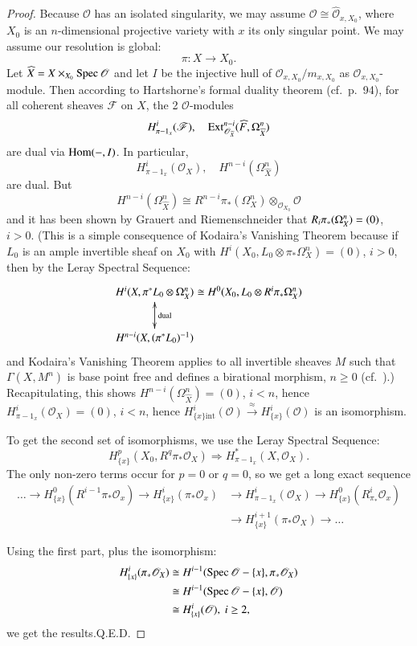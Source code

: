 \begin{proof}
Because $\mathscr{O}$ has an isolated singularity, we may assume
$\mathscr{O}\cong \widehat{\mathscr{O}}_{x,X_{0}}$, where $X_{0}$ is
an $n$-dimensional projective variety with $x$ its only singular
point. We may assume our resolution is global:
$$
\pi :X\to X_{0}.
$$
Let $\widehat{X}=X\times_{X_{0}}\operatorname{Spec} \mathscr{O}$ and let $I$ be the
injective hull of $\mathscr{O}_{x,X_{0}}/m_{x,X_{0}}$ as
$\mathscr{O}_{x,X_{0}}$-module. Then according to Hartshorne's formal
duality theorem (cf.~\cite{art01-key7}p.~94), for all coherent
sheaves $\mathscr{F}$ on $X$, the 2 $\mathscr{O}$-modules
$$
H^{i}_{\pi-1_x}(\mathscr{F}),\quad \operatorname{Ext}^{n-i}_{\mathscr{O}_{\widehat{X}}}(\widehat{F},\Omega^{n}_{\widehat{X}}) 
$$
are dual via $\operatorname{Hom}(-,I)$. In particular,
$$
H^{i}_{\pi-1_x}(\mathscr{O}_{X}),\quad
H^{n-i}(\Omega^{n}_{\widehat{X}})
$$
are dual. But 
$$
H^{n-i}(\Omega^{n}_{\widehat{X}})\cong R^{n-i}\pi_\ast
(\Omega^{n}_{X})\otimes_{\mathscr{O}_{X_{0}}}\mathscr{O} 
$$
and it has been shown by Grauert and Riemenschneider \cite{art01-key5}
that $R_{i}\pi_{\ast}\break (\Omega^{n}_{X})=(0)$, $i>0$. (This is a simple
consequence of Kodaira's Vanishing Theorem because if $L_{0}$ is an
ample invertible sheaf on $X_{0}$ with\pageoriginale
$H^{i}(X_{0},L_{0}\otimes \pi_{\ast}\Omega^{n}_{X})=(0)$, $i>0$, then
by the Leray Spectral Sequence:
\[
\xymatrix@C=-.1cm{
H^{i}(X,\pi^{*}L_{0}\otimes \Omega^{n}_{X})\ar@{<->}[d]^-{\text{dual}}
& \cong H^{0}(X_{0},L_{0}\otimes R^{i}\pi_{\ast}\Omega^{n}_{X})\\
H^{n-i}(X,(\pi^{*}L_{0})^{-1}) & 
}
\]
and Kodaira's Vanishing Theorem applies to all invertible sheaves $M$
such that $\Gamma(X,M^{n})$ is base point free and defines a
birational morphism, $n\geq 0$ (cf.~\cite{art01-key9}).)
Recapitulating, this shows $H^{n-i}(\Omega^{n}_{\widehat{X}})=(0)$,
$i<n$, hence $H^{i}_{\pi-1_{x}}(\mathscr{O}_{X})=(0)$, $i<n$, hence
$H^{i}_{\{x\}\text{int}}(\mathscr{O})\xrightarrow{\approx}H^{i}_{\{x\}}(\mathscr{O})$
is an isomorphism.

To get the second set of isomorphisms, we use the Leray Spectral
Sequence:
$$
H^{p}_{\{x\}}(X_{0},R^{q}\pi_{*}\mathscr{O}_{X})\Rightarrow
H^{*}_{\pi-1_{x}}(X,\mathscr{O}_{X}). 
$$
The only non-zero terms occur for $p=0$ or $q=0$, so we get a long
exact sequence
\begin{align*}
\ldots \to H^{0}_{\{x\}}(R^{i-1}\pi_{*}\mathscr{O}_{x})\to
H^{i}_{\{x\}}(\pi_{*}\mathscr{O}_{x}) &\to
H^{i}_{\pi-1_{x}}(\mathscr{O}_{X})\to
H^{0}_{\{x\}}(R^{i}_{\pi_{*}}\mathscr{O}_{x})\\
&\to H^{i+1}_{\{x\}}(\pi_{*}\mathscr{O}_{X})\to\ldots 
\end{align*}

Using the first part, plus the isomorphism:
\begin{align*}
H^{i}_{\{x\}}(\pi_{*}\mathscr{O}_{X}) & \cong
H^{i-1}(\operatorname{Spec} \mathscr{O}-\{x\},\pi_{*}\mathscr{O}_{X})\\
&\cong H^{i-1}(\operatorname{Spec} \mathscr{O}-\{x\},\mathscr{O})\\
&\cong H^{i}_{\{x\}}(\mathscr{O}), \ i\geq 2,
\end{align*}
we get the results.\hfill Q.E.D.
\end{proof}

